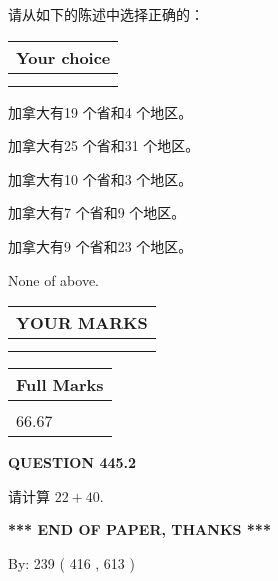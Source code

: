 \documentclass{ctexart}
\begin{document}
  
请从如下的陈述中选择正确的：
  
  
\noindent\hspace{3.0in} \begin{tabular}{|l|}
\hline
Your choice \\
\hline
 \\ 
 \\ 
\hline
\end{tabular}
  
  
 
 
加拿大有19 个省和4 个地区。
 
 
加拿大有25 个省和31 个地区。
 
 
加拿大有10 个省和3 个地区。
 
 
加拿大有7 个省和9 个地区。
 
 
加拿大有9 个省和23 个地区。
 
 
 None of above.
 
 
  
\vspace{0.2in}
  
\noindent\begin{tabular}{|l|}
\hline
 YOUR MARKS  \\
\hline
 \\ 
 \\ 
\hline
\end{tabular}
\hspace{0.05in} \begin{tabular}{|l|}
\hline
 Full Marks  \\
\hline
 \\ 
66.67 \\
\hline
\end{tabular}
{\textbf{\Large{QUESTION
445.2 
}}}
  
  
 
请计算 $ %
22 +  %
40 $.
 

 

 
   
   
 \vspace{0.2in}
 
   
   
   
   
\vspace{1.0in} 
{\textbf{\large{ *** END OF PAPER, THANKS *** }}} 
   
   
\hspace{1.0in} By: 
 239 ( 416 ,  613 )
   
\end{document}
